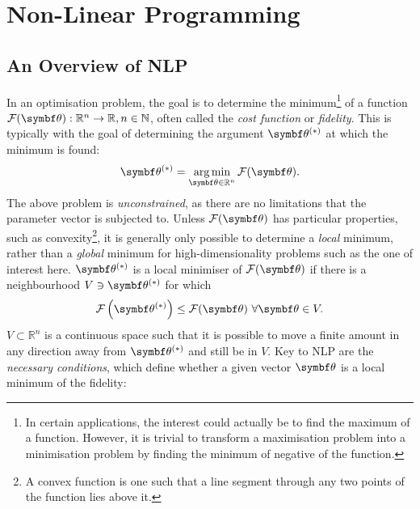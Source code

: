 \section{Non-Linear Programming}
\label{sec:nlp}

\subsection{An Overview of \ac{NLP}}
\label{subsec:nlp-overview}
In an optimisation problem, the goal is to determine the minimum\footnote{
    In certain applications, the interest could actually be to find the maximum of
    a function. However, it is trivial to transform a maximisation problem into
    a minimisation problem by finding the minimum of negative of the function.
}
of a function $\Fth: \mathbb{R}^n \rightarrow \mathbb{R}, n \in \mathbb{N}$, often
called the \emph{cost function} or \emph{fidelity}.
This is typically with the goal of determining the argument $\bthstar$ at
which the minimum is found:
\begin{equation}
    \bthstar = \argmin_{\bth \in \mathbb{R}^n} \Fth.
    \label{eq:minF}
\end{equation}
The above problem is \emph{unconstrained}, as there are no limitations that the
parameter vector is subjected to. Unless $\Fth$ has particular properties, such
as convexity\footnote{
    A convex function is one such that a line segment through any two points of
    the function lies above it.
}, it is generally only possible to determine a \emph{local} minimum,
rather than a \emph{global} minimum for high-dimensionality problems such as
the one of interest here. $\bthstar$ is a local
minimiser of $\Fth$ if there is a neighbourhood $V \ni \bthstar$ for which
\begin{equation}
    \Fthstar \leq \Fth\ \forall \bth \in V.
  \label{def:local-minimiser}
\end{equation}
$V \subset \mathbb{R}^n$ is a continuous space such that it is possible to move
a finite amount in any direction away from $\bthstar$ and still be in $V$.
Key to \ac{NLP} are the \emph{necessary conditions}, which define whether a
given vector $\bth$ is a local minimum of the fidelity:
